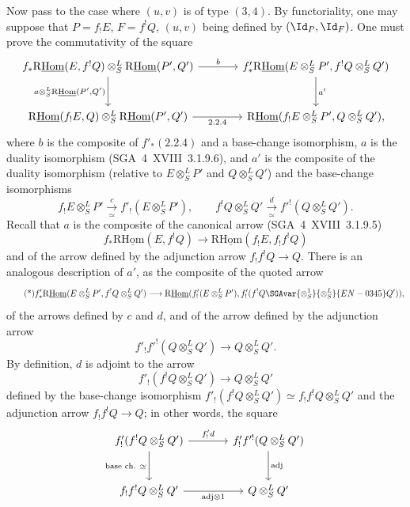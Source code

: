 Now pass to the case where $(u,v)$ is of type $(3,4)$. By functoriality, one may suppose that $P=f_{!}E$, $F=f^{!}Q$, $(u,v)$ being defined by $(\Id_P,\Id_F)$. One must prove the commutativity of the square
\[
\begin{tikzcd}[column sep=large,row sep=large]
f_*\mathrm{R}\underline{\mathrm{Hom}}(E,f^!Q)\otimes^L_S\mathrm{R}\underline{\mathrm{Hom}}(P',Q') \arrow[r,"b"] \arrow[d,"{a\otimes^L_S\mathrm{R}\underline{\mathrm{Hom}}(P',Q')}"'] & f'_*\mathrm{R}\underline{\mathrm{Hom}}(E\otimes^L_SP',f^!Q\otimes^L_SQ') \arrow[d,"a'"]\\
\mathrm{R}\underline{\mathrm{Hom}}(f_!E,Q)\otimes^L_S\mathrm{R}\underline{\mathrm{Hom}}(P',Q') \arrow[r,"2.2.4"'] & \mathrm{R}\underline{\mathrm{Hom}}(f_!E\otimes^L_SP',Q\otimes^L_SQ'),
\end{tikzcd}
\]
where %
$b$ is the composite of $f'_*(2.2.4)$ and a base-change isomorphism, $a$ is the duality isomorphism (SGA~4~XVIII~3.1.9.6), and $a'$ is the composite of the duality isomorphism (relative to $E\otimes^L_SP'$ and $Q\otimes^L_SQ'$) and the base-change isomorphisms
\[
f_!E\otimes^L_SP'\xrightarrow[\simeq]{c}f'_!(E\otimes^L_SP'),
\qquad
f^!Q\otimes^L_SQ'\xrightarrow[\simeq]{d}f'^!(Q\otimes^L_SQ').
\]
Recall that $a$ is the composite of the canonical arrow (SGA~4~XVIII~3.1.9.5)
\[
f_*\mathrm{R}\underline{\mathrm{Hom}}(E,f^!Q)\longrightarrow\mathrm{R}\underline{\mathrm{Hom}}(f_!E,f_!f^!Q)
\]
and of the arrow defined by the adjunction arrow $f_!f^!Q\to Q$. There is an analogous description of $a'$, as the composite of the quoted arrow
\begin{equation}\tag{*}
f'_*\mathrm{R}\underline{\mathrm{Hom}}(E\otimes^L_SP',f^!Q\otimes^L_SQ')\longrightarrow
\mathrm{R}\underline{\mathrm{Hom}}(f'_!(E\otimes^L_SP'),f'_!(f^!Q\SGAvar{\otimes^1_S}{\otimes^L_S}{EN-0345}Q')),
\end{equation}
of the arrows defined by $c$ and $d$, and of the arrow defined by the adjunction arrow
\[
f'_!f'^!(Q\otimes^L_SQ')\longrightarrow Q\otimes^L_SQ'.
\]
By definition, $d$ is adjoint to the arrow
\[
f'_!(f^!Q\otimes^L_SQ')\longrightarrow Q\otimes^L_SQ'
\]
defined by the base-change isomorphism $f'_!(f^!Q\otimes^L_SQ')\simeq f_!f^!Q\otimes^L_SQ'$ and the adjunction arrow $f_!f^!Q\to Q$; in other words, the square
\[
\begin{tikzcd}[column sep=large,row sep=large]
f'_!(f^!Q\otimes^L_SQ') \arrow[r,"{f'_!d}"] \arrow[d,"{\text{base ch.}\ \simeq}"'] & f'_!f'^!(Q\otimes^L_SQ') \arrow[d,"\mathrm{adj}"]\\
f_!f^!Q\otimes^L_SQ' \arrow[r,"{\mathrm{adj}\otimes 1}"'] & Q\otimes^L_SQ'
\end{tikzcd}
\]

